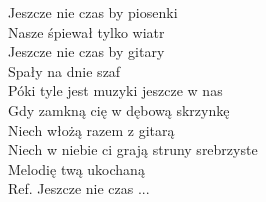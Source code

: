 \begin{flushleft}
\hspace{0.9cm}Jeszcze nie czas by piosenki \\
\hspace{0.9cm}Nasze śpiewał tylko wiatr \\
\hspace{0.9cm}Jeszcze nie czas by gitary \\
\hspace{0.9cm}Spały na dnie szaf \\
\hspace{0.9cm}Póki tyle jest muzyki jeszcze w nas \\
\vskip 3mm
Gdy zamkną cię w dębową skrzynkę \\
Niech włożą razem z gitarą \\
Niech w niebie ci grają struny srebrzyste \\
Melodię twą ukochaną \\
\vskip 3mm
Ref. Jeszcze nie czas ...
\end{flushleft}
\clearpage
